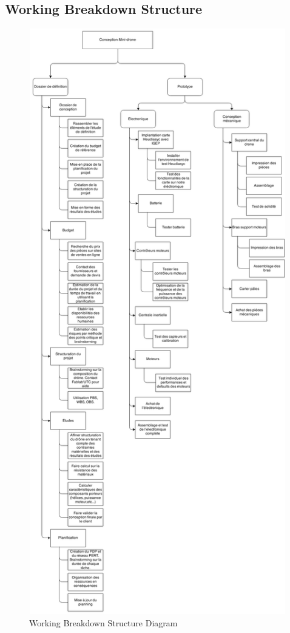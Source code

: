 \documentclass[a4paper, 12pt, leqno]{report}
\theoremstyle{plain}
\begin{document}
\begin{landscape}
        \section{Working Breakdown Structure}
        \begin{figure}[H]
           \begin{center}
           \includegraphics[height=255mm, width=140mm, angle=90]{Files/WBS_review_v3.png}
           \end{center}
           \caption{Working Breakdown Structure Diagram}
           \label{Working Breakdown Structure Diagram}
           \end{figure}
           

\end{landscape}
\end{document}
